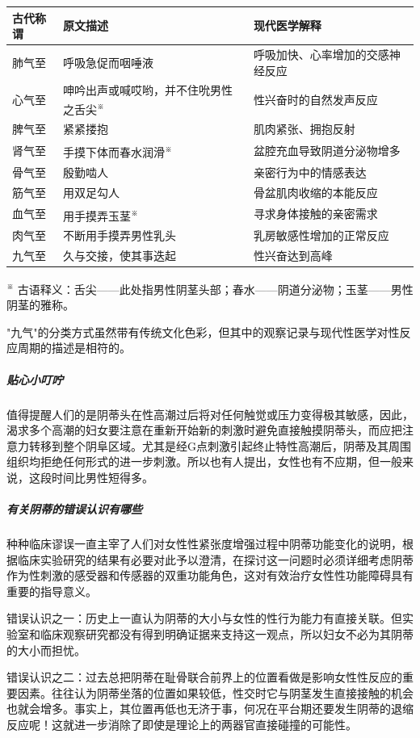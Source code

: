 \begin{enumerate}
\begin{tabular}{p{2cm} p{5cm} p{4.5cm}}
\toprule
\textbf{古代称谓} & \textbf{原文描述} & \textbf{现代医学解释} \\
\midrule
肺气至 & 呼吸急促而咽唾液 & 呼吸加快、心率增加的交感神经反应 \\
心气至 & 呻吟出声或喊哎哟，并不住吮男性之舌尖\textsuperscript{※} & 性兴奋时的自然发声反应 \\
脾气至 & 紧紧搂抱 & 肌肉紧张、拥抱反射 \\
肾气至 & 手摸下体而春水润滑\textsuperscript{※} & 盆腔充血导致阴道分泌物增多 \\
骨气至 & 殷勤啮人 & 亲密行为中的情感表达 \\
筋气至 & 用双足勾人 & 骨盆肌肉收缩的本能反应 \\
血气至 & 用手摸弄玉茎\textsuperscript{※} & 寻求身体接触的亲密需求 \\
肉气至 & 不断用手摸弄男性乳头 & 乳房敏感性增加的正常反应 \\
九气至 & 久与交接，使其事迭起 & 性兴奋达到高峰 \\
\bottomrule
\end{tabular}
\addtocounter{footnote}{-3}
\begin{flushleft}
\textsuperscript{※} 古语释义：舌尖——此处指男性阴茎头部；春水——阴道分泌物；玉茎——男性阴茎的雅称。\\
\end{flushleft}

"九气"的分类方式虽然带有传统文化色彩，但其中的观察记录与现代性医学对性反应周期的描述是相符的。

\subparagraph{贴心小叮咛}
值得提醒人们的是阴蒂头在性高潮过后将对任何触觉或压力变得极其敏感，因此，渴求多个高潮的妇女要注意在重新开始新的刺激时避免直接触摸阴蒂头，而应把注意力转移到整个阴阜区域。尤其是经G点刺激引起终止特性高潮后，阴蒂及其周围组织均拒绝任何形式的进一步刺激。所以也有人提出，女性也有不应期，但一般来说，这段时间比男性短得多。

\subparagraph{有关阴蒂的错误认识有哪些}

种种临床谬误一直主宰了人们对女性性紧张度增强过程中阴蒂功能变化的说明，根据临床实验研究的结果有必要对此予以澄清，在探讨这一问题时必须详细考虑阴蒂作为性刺激的感受器和传感器的双重功能角色，这对有效治疗女性性功能障碍具有重要的指导意义。

错误认识之一：历史上一直认为阴蒂的大小与女性的性行为能力有直接关联。但实验室和临床观察研究都没有得到明确证据来支持这一观点，所以妇女不必为其阴蒂的大小而担忧。

错误认识之二：过去总把阴蒂在耻骨联合前界上的位置看做是影响女性性反应的重要因素。往往认为阴蒂坐落的位置如果较低，性交时它与阴茎发生直接接触的机会也就会增多。事实上，其位置再低也无济于事，何况在平台期还要发生阴蒂的退缩反应呢！这就进一步消除了即使是理论上的两器官直接碰撞的可能性。


\end{enumerate}
